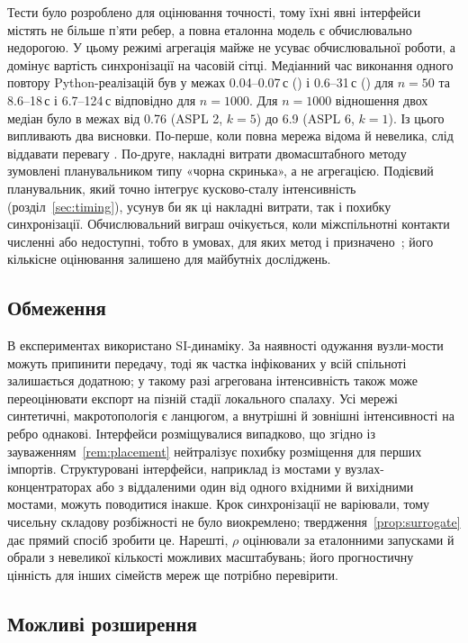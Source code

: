 Тести було розроблено для оцінювання точності, тому їхні явні інтерфейси містять не більше п'яти ребер, а повна еталонна модель є обчислювально недорогою. У цьому режимі агрегація майже не усуває обчислювальної роботи, а домінує вартість синхронізації на часовій сітці. Медіанний час виконання одного повтору Python-реалізацій був у межах 0.04--0.07\,с (\Full{}) і 0.6--31\,с (\TS{}) для $n=50$ та 8.6--18\,с і 6.7--124\,с відповідно для $n=1000$. Для $n=1000$ відношення двох медіан було в межах від 0.76 (ASPL 2, $k=5$) до 6.9 (ASPL 6, $k=1$). Із цього випливають два висновки. По-перше, коли повна мережа відома й невелика, слід віддавати перевагу \Full{}. По-друге, накладні витрати двомасштабного методу зумовлені планувальником типу «чорна скринька», а не агрегацією. Подієвий планувальник, який точно інтегрує кусково-сталу інтенсивність (розділ~\ref{sec:timing}), усунув би як ці накладні витрати, так і похибку синхронізації. Обчислювальний виграш очікується, коли міжспільнотні контакти численні або недоступні, тобто в умовах, для яких метод і призначено~\citep{kuryliak2025towards}; його кількісне оцінювання залишено для майбутніх досліджень.

\subsection{Обмеження}

В експериментах використано SI-динаміку. За наявності одужання вузли-мости можуть припинити передачу, тоді як частка інфікованих у всій спільноті залишається додатною; у такому разі агрегована інтенсивність також може переоцінювати експорт на пізній стадії локального спалаху. Усі мережі синтетичні, макротопологія є ланцюгом, а внутрішні й зовнішні інтенсивності на ребро однакові. Інтерфейси розміщувалися випадково, що згідно із зауваженням~\ref{rem:placement} нейтралізує похибку розміщення для перших імпортів. Структуровані інтерфейси, наприклад із мостами у вузлах-концентраторах або з віддаленими один від одного вхідними й вихідними мостами, можуть поводитися інакше. Крок синхронізації не варіювали, тому чисельну складову розбіжності не було виокремлено; твердження~\ref{prop:surrogate} дає прямий спосіб зробити це. Нарешті, $\rho$ оцінювали за еталонними запусками й обрали з невеликої кількості можливих масштабувань; його прогностичну цінність для інших сімейств мереж ще потрібно перевірити.

\subsection{Можливі розширення}

